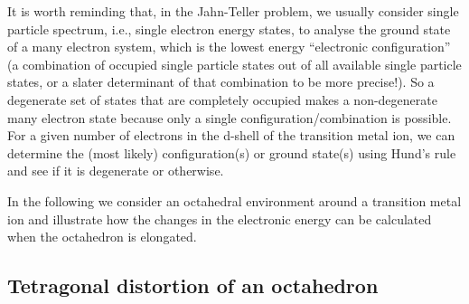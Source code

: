\documentclass[a4paper,prb,twocolumn]{revtex4-1}  %
\newcommand{\com}[1]{}
\begin{document}
\com{
The dependence of the elastic energy on the distortion can be roughly explained
as follows.
Consider a 
hypothetical 
distortion of an octahedron 
along two of its axes, say, by $a\delta_1,a\delta_2$,
where $a$ is the lattice constant of the cubic structure.
The corresponding change in the unit cell volume would be linear in $\delta_{1,2}$
as $\sim a^3\left(\delta_1+\delta_1\right)$
so the elastic energy %
changes as $\sim\left(\delta_1+\delta_1\right)^2$.
A linear change ($\propto \delta_{1/2}$) in the electronic spectrum is required to produce
 a finite distortion in the optimum structure (or the ground state of full electron-lattice/nuclear problem).
}

It is worth reminding that, in the Jahn-Teller problem,
we usually consider single particle spectrum, i.e.,
single electron energy states,
to analyse the ground state of a many electron system,
which is the lowest energy ``electronic configuration'' 
(a combination of occupied single particle states 
out of all available single particle states, 
or a slater determinant of that combination to be more precise!).
So a degenerate set of states that are completely occupied
makes a non-degenerate many electron state because 
only a single configuration/combination is possible.
For a given number of electrons in the d-shell of the transition metal ion,
we can determine the (most likely) configuration(s) or ground state(s)
using Hund's rule and see if it is degenerate or otherwise.
  



\com{
Instability:\\
 Low/high spin configurations, rules/arguments using single particle spectrum and a given low/high spin state with a given number of electrons:\\
elastic energy vs electronic... number of electrons... multi-electron configurations.... degenerate vs non-degenerate cases...
}






In the following we 
consider an octahedral environment around a transition metal ion 
and 
illustrate how the changes in the electronic energy 
can be calculated
 when the octahedron is elongated.











\subsection{Tetragonal distortion of an octahedron}
\end{document}
